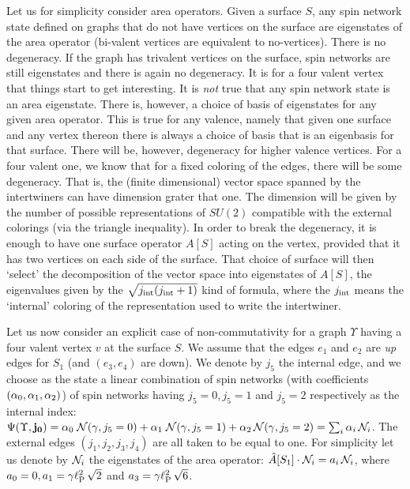\documentclass[aps,prd,tightenlines,showpacs,nofootinbib,preprint]{revtex4}
\begin{document}
Let us for simplicity consider area operators. Given a surface
$S$, any spin network state defined on graphs that do not have
vertices on the surface are eigenstates of the area operator
(bi-valent vertices are equivalent to no-vertices). There is no
degeneracy. If the graph has trivalent vertices on the surface,
spin networks are still eigenstates and there is again no
degeneracy. It is for a four valent vertex that things start to
get interesting. It is {\it not} true that any spin network state
is an area eigenstate. There is, however, a choice of basis of
eigenstates for any given area operator. This is true for any
valence, namely that given one surface and any vertex thereon
there is always a choice of basis that is an eigenbasis for that
surface. There will be, however, degeneracy for higher valence
vertices. For a four valent one, we know that for a fixed coloring
of the edges, there will be some degeneracy. That is, the (finite
dimensional) vector space spanned by the intertwiners can have
dimension grater that one. The dimension will be given by the
number of possible representations of $SU(2)$ compatible with the
external colorings (via the triangle inequality). In order to
break the degeneracy, it is enough to have one surface operator
$A[S]$ acting on the vertex, provided that it has two vertices on
each side of the surface. That choice of surface will then
`select' the decomposition of the vector space into eigenstates of
$A[S]$, the eigenvalues given by the $\sqrt{j_{\rm int}(j_{\rm
int}+1)}$ kind of formula, where the $j_{\rm int}$ means the
`internal' coloring of the representation used to write the
intertwiner.

Let us now consider an explicit case of non-commutativity for a
graph $\Upsilon$ having a four valent vertex $v$ at the surface
$S$. We assume that the edges $e_1$ and $e_2$ are {\it up} edges
for $S_1$ (and $(e_3,e_4)$ are down). We denote by $j_5$  the
internal edge, and we choose as the state a linear combination of
spin networks (with coefficients $({\alpha}_0,{\alpha}_1,{\alpha}_2)$) of spin
networks having $j_5=0,j_5=1$ and $j_5=2$ respectively as the
internal index: ${\Psi}(\Upsilon,{\bf j_0})={\alpha}_{0}\;{\cal
N}(\gamma,{j}_5=0)+{\alpha}_{1}\;{\cal N}(\gamma,{j}_5=1)+{\alpha}_2\,{\cal
N}(\gamma,{j}_5=2)=\sum_i{\alpha}_i\,{\cal N}_i$. The external edges
$(j_1,j_2,j_3,j_4)$ are all taken to be equal to one. For
simplicity let us denote by ${\cal N}_i$ the eigenstates of the
area operator: $\hat{A}[S_1]\cdot {\cal N} _i=a_i\,{\cal N}_i$,
where $a_0=0,a_1=\gamma\ell^2_{\rm P}\,\sqrt{2}$ and
$a_3=\gamma\ell^2_{\rm P}\,\sqrt{6}$.
\end{document}
